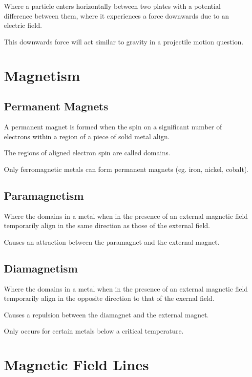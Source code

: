 \documentclass[a4paper,11pt]{article}
\begin{document}
Where a particle enters horizontally between two plates with a potential
difference between them, where it experiences a force downwards due to an
electric field.

This downwards force will act similar to gravity in a projectile motion
question.




\section{Magnetism}

\subsection{Permanent Magnets}

A permanent magnet is formed when the spin on a significant number of
electrons within a region of a piece of solid metal align.

The regions of aligned electron spin are called domains.

Only ferromagnetic metals can form permanent magnets (eg. iron, nickel,
cobalt).


\subsection{Paramagnetism}

Where the domains in a metal when in the presence of an external magnetic field
temporarily align in the same direction as those of the external field.

Causes an attraction between the paramagnet and the external magnet.


\subsection{Diamagnetism}

Where the domains in a metal when in the presence of an external magnetic field
temporarily align in the opposite direction to that of the exernal field.

Causes a repulsion between the diamagnet and the external magnet.

Only occurs for certain metals below a critical temperature.




\section{Magnetic Field Lines}
\end{document}
